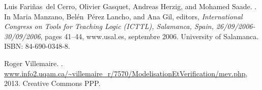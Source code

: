 \documentclass[a4paper,UKenglish]{lipics}
\begin{document}
\begin{thebibliography}{1}
Luis Fari\~nas~del Cerro, Olivier Gasquet, Andreas Herzig, and Mohamed Saade.
.
\newblock In Maria Manzano, Bel\'en~P\'erez Lancho, and Ana Gil, editors, {\em
  {International Congress on Tools for Teaching Logic (ICTTL), Salamanca,
  Spain, 26/09/2006-30/09/2006}}, pages 41--44, www.usal.es, septembre 2006.
  University of Salamanca.
\newblock ISBN: 84-690-0348-8.

Roger Villemaire.
.
\newblock
  \url{www.info2.uqam.ca/~villemaire_r/7570/ModelisationEtVerification/mev.php},
  2013.
\newblock Creative Commons PPP.

\end{thebibliography}







\newpage
\thispagestyle{empty}
{\ }
\end{document}
